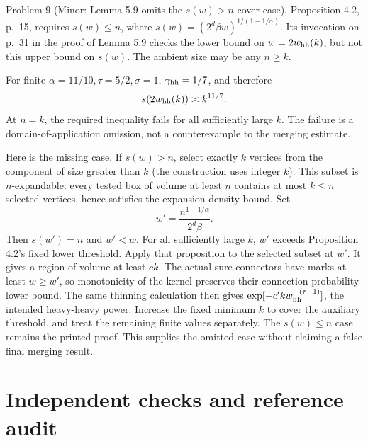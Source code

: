 \documentclass[10pt]{article}
\begin{document}
Problem 9 (Minor: Lemma 5.9 omits the \(s(w)>n\) cover case).  Proposition 4.2, p. 15, requires \(s(w)\leq n\), where \(s(w)=(2^d\beta w)^{1/(1-1/\alpha)}\). Its invocation on p. 31 in the proof of Lemma 5.9 checks the lower bound on \(w=2w_{\rm hh}(k)\), but not this upper bound on \(s(w)\). The ambient size may be any \(n\geq k\).\par
For finite \(\alpha=11/10,\tau=5/2,\sigma=1\), \(\gamma_{\rm hh}=1/7\), and therefore \[s(2w_{\rm hh}(k))\asymp k^{11/7}.\] At \(n=k\), the required inequality fails for all sufficiently large \(k\). The failure is a domain-of-application omission, not a counterexample to the merging estimate.\par
Here is the missing case. If \(s(w)>n\), select exactly \(k\) vertices from the component of size greater than \(k\) (the construction uses integer \(k\)). This subset is \(n\)-expandable: every tested box of volume at least \(n\) contains at most \(k\leq n\) selected vertices, hence satisfies the expansion density bound. Set \[w'=\frac{n^{1-1/\alpha}}{2^d\beta}.\] Then \(s(w')=n\) and \(w'<w\). For all sufficiently large \(k\), \(w'\) exceeds Proposition 4.2’s fixed lower threshold. Apply that proposition to the selected subset at \(w'\). It gives a region of volume at least \(c k\). The actual sure-connectors have marks at least \(w\geq w'\), so monotonicity of the kernel preserves their connection probability lower bound. The same thinning calculation then gives \(\exp[-c'k w_{\rm hh}^{-(\tau-1)}]\), the intended heavy-heavy power. Increase the fixed minimum \(k\) to cover the auxiliary threshold, and treat the remaining finite values separately. The \(s(w)\leq n\) case remains the printed proof. This supplies the omitted case without claiming a false final merging result.\par
\section*{Independent checks and reference audit}
\end{document}
